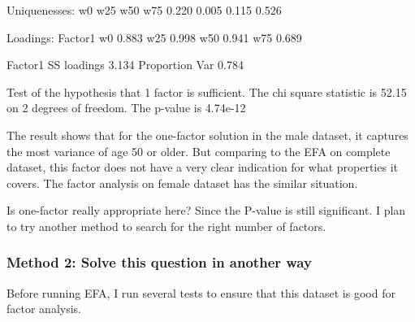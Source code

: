 \documentclass[
]{article}
\newenvironment{Shaded}{\begin{snugshade}}{\end{snugshade}}
\newcommand{\DecValTok}[1]{\textcolor[rgb]{0.00,0.00,0.81}{#1}}
\newcommand{\FloatTok}[1]{\textcolor[rgb]{0.00,0.00,0.81}{#1}}
\newcommand{\NormalTok}[1]{#1}
\newcommand{\SpecialCharTok}[1]{\textcolor[rgb]{0.00,0.00,0.00}{#1}}
\begin{document}
\begin{Shaded}
\begin{Highlighting}[]
\NormalTok{Uniquenesses}\SpecialCharTok{:}
\NormalTok{   w0   w25   w50   w75 }
\FloatTok{0.220} \FloatTok{0.005} \FloatTok{0.115} \FloatTok{0.526} 

\NormalTok{Loadings}\SpecialCharTok{:}
\NormalTok{    Factor1}
\NormalTok{w0  }\FloatTok{0.883}  
\NormalTok{w25 }\FloatTok{0.998}  
\NormalTok{w50 }\FloatTok{0.941}  
\NormalTok{w75 }\FloatTok{0.689}  

\NormalTok{               Factor1}
\NormalTok{SS loadings      }\FloatTok{3.134}
\NormalTok{Proportion Var   }\FloatTok{0.784}

\NormalTok{Test of the hypothesis that }\DecValTok{1}\NormalTok{ factor is sufficient.}
\NormalTok{The chi square statistic is }\FloatTok{52.15}\NormalTok{ on }\DecValTok{2}\NormalTok{ degrees of freedom.}
\NormalTok{The p}\SpecialCharTok{{-}}\NormalTok{value is }\FloatTok{4.74e{-}12} 
\end{Highlighting}
\end{Shaded}

The result shows that for the one-factor solution in the male dataset,
it captures the most variance of age 50 or older. But comparing to the
EFA on complete dataset, this factor does not have a very clear
indication for what properties it covers. The factor analysis on female
dataset has the similar situation.

Is one-factor really appropriate here? Since the P-value is still
significant. I plan to try another method to search for the right number
of factors.

\hypertarget{method-2-solve-this-question-in-another-way}{%
\subsubsection{Method 2: Solve this question in another
way}\label{method-2-solve-this-question-in-another-way}}

Before running EFA, I run several tests to ensure that this dataset is
good for factor analysis.
\end{document}
